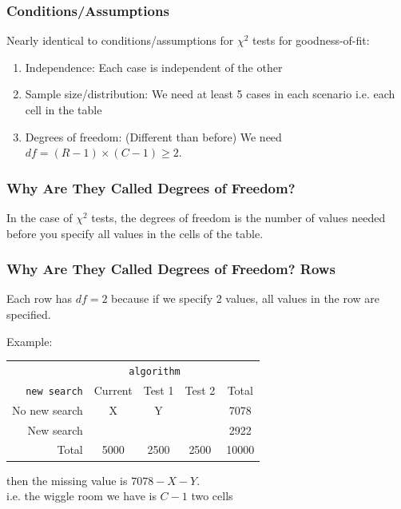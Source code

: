 \documentclass[handout]{beamer}
\newcommand{\blue}[1]{\textcolor{blue2}{#1}}
\begin{document}
\begin{frame}
\frametitle{Conditions/Assumptions}
Nearly identical to conditions/assumptions for $\chi^2$ tests for goodness-of-fit:
\begin{enumerate}
\pause\item \blue{Independence}:  Each case is independent of the other
\pause\item \blue{Sample size/distribution}:  We need at least 5 cases in each scenario i.e. each cell in the table
\pause\item \blue{Degrees of freedom}: (Different than before)  We need $df=(R-1)\times(C-1) \geq 2$.
\end{enumerate}
\end{frame}


\begin{frame}
\frametitle{Why Are They Called Degrees of Freedom?}

In the case of $\chi^2$ tests, the degrees of freedom is the number of values needed before you specify \blue{all} values in the cells of the table.

\end{frame}


\begin{frame}
\frametitle{Why Are They Called Degrees of Freedom? Rows}

\pause Each row has $df=2$ because if we specify 2 values, all values in the row are specified.  

\vspace{0.5cm}

\pause Example:
\begin{center}
  \begin{tabular}{r|ccc|c}
& \multicolumn{3}{c|}{{\tt algorithm}} & \\
       {\tt new search} & Current & Test 1 & Test 2 & Total \\ 
\hline
    No new search & X & Y &  & 7078 \\ 
    New search &  &  &  & 2922 \\ 
\hline
    Total & 5000 & 2500 & 2500 & 10000 \\ 
  \end{tabular}
\end{center}
\pause
then the missing value is $7078-X-Y$.\\ 
i.e. the \blue{wiggle room} we have is $C-1$ two cells

\end{frame}
\end{document}
